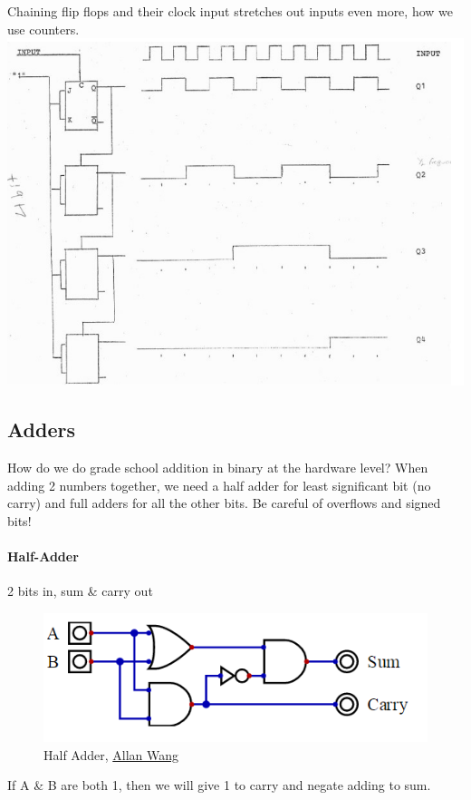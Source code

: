 \documentclass[12 pt]{article}
\begin{document}
	Chaining flip flops and their clock input stretches out inputs even more, how we use counters. \includegraphics[scale=0.5]{bc}
	\subsection{Adders} How do we do grade school addition in binary at the hardware level? When adding 2 numbers together, we need a half adder for least significant bit (no carry) and full adders for all the other bits. Be careful of overflows and signed bits!
	\paragraph{Half-Adder} 2 bits in, sum \& carry out
		\begin{figure}[H]
			\caption{Half Adder, \href{https://www.allanwang.ca/notes/mcgill/comp273/0.php}{Allan Wang}}
			\begin{center}
				\includegraphics{ha}
			\end{center}
		\end{figure}
		If A \& B are both 1, then we will give 1 to carry and negate adding to sum.
\end{document}
